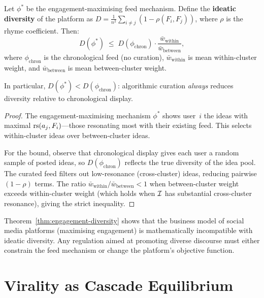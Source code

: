 \begin{theorem}
\label{thm:engagement-diversity}
Let $\phi^*$ be the engagement-maximising feed mechanism.  Define
the \textbf{ideatic diversity} of the platform as
$D = \frac{1}{n^2} \sum_{i \ne j} (1 - \rho(F_i, F_j))$, where
$\rho$ is the rhyme coefficient.  Then:
\[
  D(\phi^*) \;\le\;
  D(\phi_{\mathrm{chron}}) \cdot
  \frac{\bar{w}_{\mathrm{within}}}{\bar{w}_{\mathrm{between}}},
\]
where $\phi_{\mathrm{chron}}$ is the chronological feed (no curation),
$\bar{w}_{\mathrm{within}}$ is mean within-cluster weight, and
$\bar{w}_{\mathrm{between}}$ is mean between-cluster weight.

In particular, $D(\phi^*) < D(\phi_{\mathrm{chron}})$:
algorithmic curation \emph{always} reduces diversity relative
to chronological display.
\end{theorem}

\begin{proof}
The engagement-maximising mechanism $\phi^*$ shows user~$i$ the
ideas with maximal $\mathrm{rs}(a_j, F_i)$---those resonating most with
their existing feed.  This selects within-cluster ideas over
between-cluster ideas.

For the bound, observe that chronological display gives each
user a random sample of posted ideas, so $D(\phi_{\mathrm{chron}})$
reflects the true diversity of the idea pool.  The curated feed
filters out low-resonance (cross-cluster) ideas, reducing
pairwise $(1-\rho)$ terms.  The ratio
$\bar{w}_{\mathrm{within}}/\bar{w}_{\mathrm{between}} < 1$
when between-cluster weight exceeds within-cluster weight
(which holds when $\mathcal{I}$ has substantial cross-cluster
resonance), giving the strict inequality.
\end{proof}

\begin{remark}
Theorem~\ref{thm:engagement-diversity} shows that the business
model of social media platforms (maximising engagement) is
mathematically incompatible with ideatic diversity.  Any regulation
aimed at promoting diverse discourse must either constrain the
feed mechanism or change the platform's objective function.
\end{remark}

\section{Virality as Cascade Equilibrium}
\label{sec:virality}

